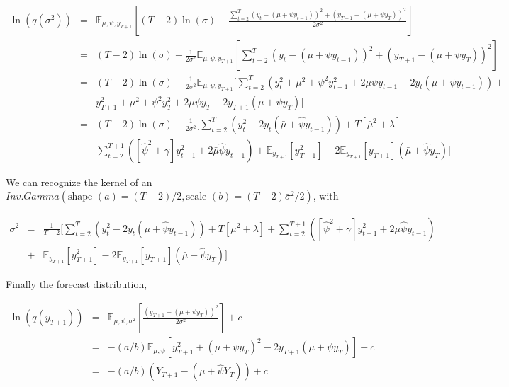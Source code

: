 \documentclass{article}
\begin{document}
\begin{eqnarray*}
\label{qsig}
\ln(q(\sigma^2)) & = & \mathbb{E}_{\mu, \psi, y_{T+1}} \left[  (T-2) \ln(\sigma) - \frac{\sum^{T}_{t=2}(y_t-(\mu+\psi y_{t-1}))^2 + (y_{T+1}-(\mu+\psi y_T))^2}{2\sigma^2}  \right] \\
& = & (T-2) \ln(\sigma) - \frac{1}{2\sigma^2} \mathbb{E}_{\mu, \psi, y_{T+1}} \left[\sum^{T}_{t=2}(y_t-(\mu+\psi y_{t-1}))^2 + (y_{T+1}-(\mu+\psi y_T))^2 \right] \\
& = & (T-2) \ln(\sigma) - \frac{1}{2\sigma^2} \mathbb{E}_{\mu, \psi, y_{T+1}} \Bigg[ \sum^{T}_{t=2} (y_t^2 + \mu^2 + \psi^2 y_{t-1}^2 + 2 \mu \psi y_{t-1} - 2 y_t (\mu+\psi y_{t-1})) + \\
& + & y_{T+1}^2 +  \mu^2 + \psi^2 y_{T}^2 + 2 \mu \psi y_{T} - 2 y_{T+1}(\mu+\psi y_T)\Bigg] \\
& = & (T-2) \ln(\sigma) - \frac{1}{2\sigma^2} \Bigg[ \sum^{T}_{t=2} \left(y_t^2  - 2 y_t (\bar{\mu} + \hat{\psi} y_{t-1})\right) + T [\bar{\mu}^2 + \lambda ]  \\
& + & \sum^{T+1}_{t=2} \left([\hat{\psi}^2 + \gamma ] y_{t-1}^2 + 2 \bar{\mu} \hat{\psi} y_{t-1} \right) + \mathbb{E}_{y_{T+1}} [y_{T+1}^2 ]  - 2 \mathbb{E}_{y_{T+1}} [y_{T+1} ](\bar{\mu} + \hat{\psi} y_T)\Bigg]
\end{eqnarray*}

We can recognize the kernel of an $Inv. Gamma ( \mbox{shape } (a) = (T-2)/2, \mbox{scale } (b) = (T-2)\bar{\sigma}^2 /2 )$, with 

\begin{eqnarray*}
\label{sigbar}
\bar{\sigma}^2 & = & \frac{1}{T-2} \Bigg[ \sum^{T}_{t=2} \left(y_t^2  - 2 y_t (\bar{\mu} + \hat{\psi} y_{t-1})\right) + T [\bar{\mu}^2 + \lambda ] + \sum^{T+1}_{t=2} \left([\hat{\psi}^2 + \gamma ] y_{t-1}^2 + 2 \bar{\mu} \hat{\psi} y_{t-1} \right) \\
& + & \mathbb{E}_{y_{T+1}} [y_{T+1}^2 ]  - 2 \mathbb{E}_{y_{T+1}} [y_{T+1} ](\bar{\mu} + \hat{\psi} y_T) \Bigg]
\end{eqnarray*}

Finally the forecast distribution,

\begin{eqnarray*}
\label{T+1}
\ln(q(y_{T+1})) & = & \mathbb{E}_{\mu, \psi, \sigma^2} \left[ \frac{(y_{T+1}-(\mu+\psi y_T))^2}{2\sigma^2} \right] + c \\
& = & - (a/b)  \mathbb{E}_{\mu, \psi} \left[ y_{T+1}^2+(\mu+\psi y_T)^2 - 2 y_{T+1}(\mu+\psi y_T) \right] + c\\
& = & - (a/b) \left(Y_{T+1} - (\bar{\mu} + \hat{\psi}Y_{T}) \right) + c
\end{eqnarray*}
\end{document}
